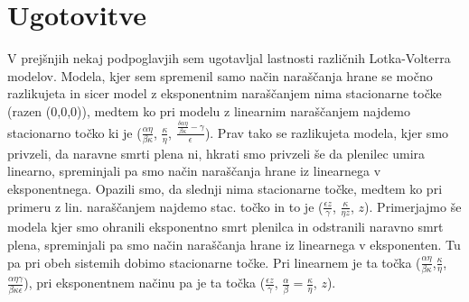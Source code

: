 \documentclass[11pt]{report}
\begin{document}
	\section{Ugotovitve}
	V prejšnjih nekaj podpoglavjih sem ugotavljal lastnosti različnih Lotka-Volterra modelov. Modela, kjer sem spremenil samo način naraščanja hrane se močno razlikujeta in sicer model z eksponentnim naraščanjem nima stacionarne točke (razen (0,0,0)), medtem ko pri modelu z linearnim naraščanjem najdemo stacionarno točko ki je ($\frac{\alpha \eta}{\beta \kappa}$, $\frac{\kappa}{\eta}$, $\frac{\frac{\delta \alpha \eta}{\beta \kappa} - \gamma}{\epsilon}$). Prav tako se razlikujeta modela, kjer smo privzeli, da naravne smrti plena ni, hkrati smo privzeli še da plenilec umira linearno, spreminjali pa smo način naraščanja hrane iz linearnega v eksponentnega.
	Opazili smo, da slednji nima stacionarne točke, medtem ko pri primeru z lin. naraščanjem najdemo stac. točko in to je ($\frac{\epsilon z }{\gamma}$, $\frac{\kappa}{\eta z}$, $z$).
	Primerjajmo še modela kjer smo ohranili eksponentno smrt plenilca in odstranili naravno smrt plena, spreminjali pa smo način naraščanja hrane iz linearnega v eksponenten. Tu pa pri obeh sistemih dobimo stacionarne točke. Pri linearnem je ta točka ($\frac{\alpha \eta}{\beta \kappa}$,$\frac{\kappa}{\eta}$,$ \frac{\alpha \eta \gamma}{\beta \kappa \epsilon}$), pri eksponentnem načinu pa je ta točka ($\frac{\epsilon z}{\gamma}$, $\frac{\alpha}{\beta}=\frac{\kappa}{\eta}$, $z$).
	
	
	
	
	
	
	
	
	
	
	
	
	

 	
 	
 	
 	
 	
 	
 	
 
 	
 	
\end{document}
